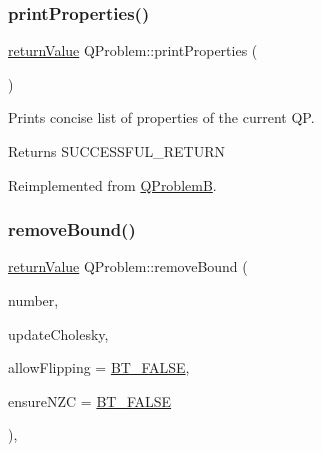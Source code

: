 \subsubsection{\texorpdfstring{print\+Properties()}{printProperties()}}
{\footnotesize\ttfamily \hyperlink{_message_handling_8hpp_a81d556f613bfbabd0b1f9488c0fa865e}{return\+Value} Q\+Problem\+::print\+Properties (\begin{DoxyParamCaption}{ }\end{DoxyParamCaption})\hspace{0.3cm}{\ttfamily [virtual]}}

Prints concise list of properties of the current QP. \begin{DoxyReturn}{Returns}
S\+U\+C\+C\+E\+S\+S\+F\+U\+L\+\_\+\+R\+E\+T\+U\+RN ~\newline
 
\end{DoxyReturn}


Reimplemented from \hyperlink{class_q_problem_b_a587077ee58951d181f89674fd9c15f7b}{Q\+ProblemB}.

\mbox{\label{class_q_problem_aac5ab4f39632a30300eb9e3c8788c4b9}} 
\subsubsection{\texorpdfstring{remove\+Bound()}{removeBound()}}
{\footnotesize\ttfamily \hyperlink{_message_handling_8hpp_a81d556f613bfbabd0b1f9488c0fa865e}{return\+Value} Q\+Problem\+::remove\+Bound (\begin{DoxyParamCaption}\item[{\hyperlink{_types_8hpp_ab6fd6105e64ed14a0c9281326f05e623}{int\+\_\+t}}]{number,  }\item[{\hyperlink{_types_8hpp_a20f82124c82b6f5686a7fce454ef9089}{Boolean\+Type}}]{update\+Cholesky,  }\item[{\hyperlink{_types_8hpp_a20f82124c82b6f5686a7fce454ef9089}{Boolean\+Type}}]{allow\+Flipping = {\ttfamily \hyperlink{_types_8hpp_a20f82124c82b6f5686a7fce454ef9089a85b8a20e72a8bea5dd10a6007fe3071e}{B\+T\+\_\+\+F\+A\+L\+SE}},  }\item[{\hyperlink{_types_8hpp_a20f82124c82b6f5686a7fce454ef9089}{Boolean\+Type}}]{ensure\+N\+ZC = {\ttfamily \hyperlink{_types_8hpp_a20f82124c82b6f5686a7fce454ef9089a85b8a20e72a8bea5dd10a6007fe3071e}{B\+T\+\_\+\+F\+A\+L\+SE}} }\end{DoxyParamCaption})\hspace{0.3cm}{\ttfamily [protected]}, {\ttfamily [virtual]}}

